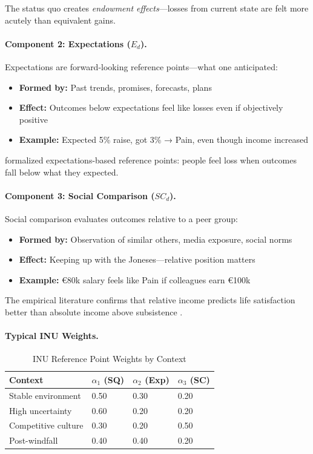 The status quo creates \emph{endowment effects}---losses from current state 
are felt more acutely than equivalent gains.

\paragraph{Component 2: Expectations ($E_d$).}
Expectations are forward-looking reference points---what one anticipated:

\begin{itemize}
\item \textbf{Formed by:} Past trends, promises, forecasts, plans
\item \textbf{Effect:} Outcomes below expectations feel like losses even if 
objectively positive
\item \textbf{Example:} Expected 5\% raise, got 3\% → Pain, even though income increased
\end{itemize}

\citet{koszegi2006model} formalized expectations-based reference points:
people feel loss when outcomes fall below what they expected.

\paragraph{Component 3: Social Comparison ($SC_d$).}
Social comparison evaluates outcomes relative to a peer group:

\begin{itemize}
\item \textbf{Formed by:} Observation of similar others, media exposure, social norms
\item \textbf{Effect:} Keeping up with the Joneses---relative position matters
\item \textbf{Example:} \euro{80k} salary feels like Pain if colleagues earn \euro{100k}
\end{itemize}

The empirical literature confirms that relative income predicts life satisfaction 
better than absolute income above subsistence \citep{clark2008relative}.

\paragraph{Typical INU Weights.}

\begin{table}[htbp]
\centering
\caption{INU Reference Point Weights by Context}
\label{tab:inu-weights}
\renewcommand{\arraystretch}{1.3}
\begin{tabular}{@{}llll@{}}
\toprule
\textbf{Context} & $\alpha_1$ (SQ) & $\alpha_2$ (Exp) & $\alpha_3$ (SC) \\
\midrule
Stable environment & 0.50 & 0.30 & 0.20 \\
High uncertainty & 0.60 & 0.20 & 0.20 \\
Competitive culture & 0.30 & 0.20 & 0.50 \\
Post-windfall & 0.40 & 0.40 & 0.20 \\
\bottomrule
\end{tabular}
\end{table}

